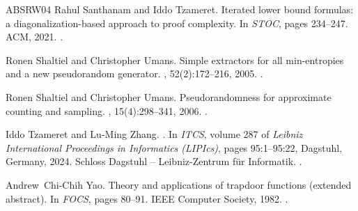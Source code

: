 \documentclass[10pt,a4paper]{article}
\theoremstyle{definition}
\theoremstyle{remark}
\begin{document}
\begin{thebibliography}{ABSRW04}
Rahul Santhanam and Iddo Tzameret.
\newblock Iterated lower bound formulas: a diagonalization-based approach to
  proof complexity.
\newblock In {\em {STOC}}, pages 234--247. {ACM}, 2021.
\newblock \href {https://doi.org/10.1145/3406325.3451010}
  {}.

Ronen Shaltiel and Christopher Umans.
\newblock Simple extractors for all min-entropies and a new pseudorandom
  generator.
, 52(2):172--216, 2005.
\newblock \href {https://doi.org/10.1145/1059513.1059516}
  {}.

Ronen Shaltiel and Christopher Umans.
\newblock Pseudorandomness for approximate counting and sampling.
, 15(4):298--341, 2006.
\newblock \href {https://doi.org/10.1007/S00037-007-0218-9}
  {}.

Iddo Tzameret and Lu-Ming Zhang.
.
\newblock In {\em {ITCS}}, volume 287 of {\em Leibniz International Proceedings
  in Informatics (LIPIcs)}, pages 95:1--95:22, Dagstuhl, Germany, 2024. Schloss
  Dagstuhl -- Leibniz-Zentrum f{\"u}r Informatik.
\newblock \href {https://doi.org/10.4230/LIPIcs.ITCS.2024.95}
  {}.

Andrew~Chi{-}Chih Yao.
\newblock Theory and applications of trapdoor functions (extended abstract).
\newblock In {\em {FOCS}}, pages 80--91. {IEEE} Computer Society, 1982.
\newblock \href {https://doi.org/10.1109/SFCS.1982.45}
  {}.

\end{thebibliography}
\end{document}
